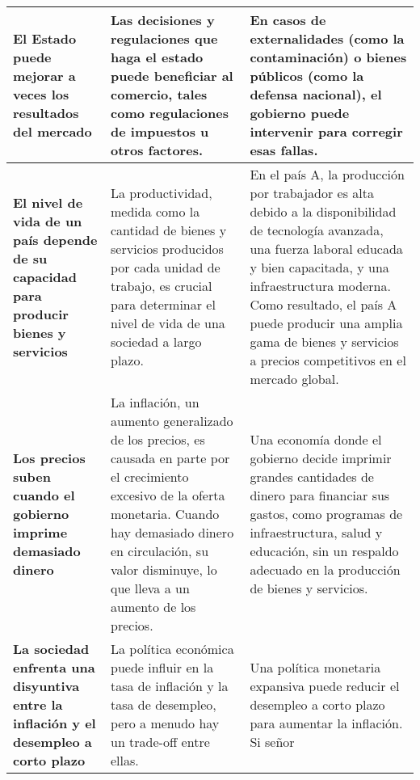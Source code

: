 \begin{longtable}{|m{4cm}|m{5.3cm}|m{4.2cm}|}
    \hline
    \centering \textbf{El Estado puede mejorar a veces los resultados del mercado} & Las decisiones y regulaciones que haga el estado puede beneficiar al comercio, tales como regulaciones de impuestos u otros factores. & En casos de externalidades (como la contaminación) o bienes públicos (como la defensa nacional), el gobierno puede intervenir para corregir esas fallas. \\ [5pt]
    \hline
    \centering \textbf{El nivel de vida de un país depende de su capacidad para producir bienes y servicios} & La productividad, medida como la cantidad de bienes y servicios producidos por cada unidad de trabajo, es crucial para determinar el nivel de vida de una sociedad a largo plazo. & En el país A, la producción por trabajador es alta debido a la disponibilidad de tecnología avanzada, una fuerza laboral educada y bien capacitada, y una infraestructura moderna. Como resultado, el país A puede producir una amplia gama de bienes y servicios a precios competitivos en el mercado global. \\ [5pt]
    \hline
    \centering \textbf{Los precios suben cuando el gobierno imprime demasiado dinero} & La inflación, un aumento generalizado de los precios, es causada en parte por el crecimiento excesivo de la oferta monetaria. Cuando hay demasiado dinero en circulación, su valor disminuye, lo que lleva a un aumento de los precios. & Una economía donde el gobierno decide imprimir grandes cantidades de dinero para financiar sus gastos, como programas de infraestructura, salud y educación, sin un respaldo adecuado en la producción de bienes y servicios. \\ [5pt]
    \hline
    \centering \textbf{La sociedad enfrenta una disyuntiva entre la inflación y el desempleo a corto plazo} & La política económica puede influir en la tasa de inflación y la tasa de desempleo, pero a menudo hay un trade-off entre ellas. & Una política monetaria expansiva puede reducir el desempleo a corto plazo para aumentar la inflación. Si señor \\ [5pt]
    \hline
\end{longtable}